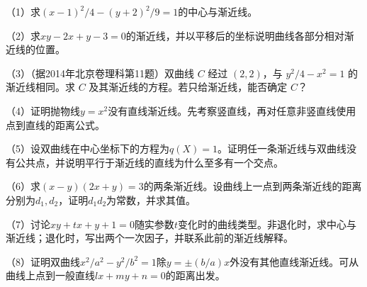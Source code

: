 \begin{exercise}
\mbox{}

\begin{samepage}
（1）求\((x-1)^2/4-(y+2)^2/9=1\)的中心与渐近线。
\par
\end{samepage}

\begin{samepage}
（2）求\(xy-2x+y-3=0\)的渐近线，并以平移后的坐标说明曲线各部分相对渐近线的位置。
\par
\end{samepage}

\begin{samepage}
（3）（据2014年北京卷理科第11题）双曲线 \(C\) 经过 \((2,2)\)，与 \(y^2/4-x^2=1\) 的渐近线相同。求 \(C\) 及其渐近线的方程。若只给渐近线，能否确定 \(C\)？
\par
\end{samepage}

\begin{samepage}
（4）证明抛物线\(y=x^2\)没有直线渐近线。先考察竖直线，再对任意非竖直线使用点到直线的距离公式。
\par
\end{samepage}

\begin{samepage}
（5）设双曲线在中心坐标下的方程为\(q(X)=1\)。证明任一条渐近线与双曲线没有公共点，并说明平行于渐近线的直线为什么至多有一个交点。
\par
\end{samepage}

\begin{samepage}
（6）求\((x-y)(2x+y)=3\)的两条渐近线。设曲线上一点到两条渐近线的距离分别为\(d_1,d_2\)，证明\(d_1d_2\)为常数，并求其值。
\par
\end{samepage}

\begin{samepage}
（7）讨论\(xy+tx+y+1=0\)随实参数\(t\)变化时的曲线类型。非退化时，求中心与渐近线；退化时，写出两个一次因子，并联系此前的渐近线解释。
\par
\end{samepage}

\begin{samepage}
（8）证明双曲线\(x^2/a^2-y^2/b^2=1\)除\(y=\pm(b/a)x\)外没有其他直线渐近线。可从曲线上点到一般直线\(lx+my+n=0\)的距离出发。
\par
\end{samepage}
\end{exercise}
\newpage
